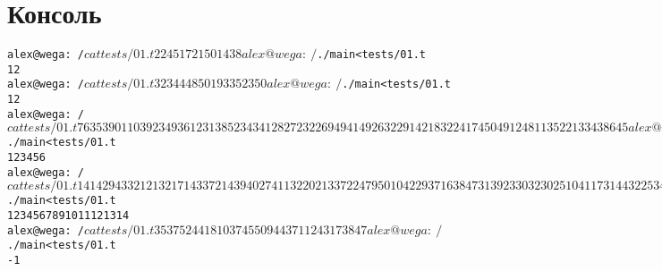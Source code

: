 \pagebreak

\section{Консоль}
\begin{alltt}
alex@wega:~/$ cat tests/01.t 
2 2
45 17 21
50 14 38
alex@wega:~/$ ./main < tests/01.t 
1 2 
alex@wega:~/$ cat tests/01.t 
3 2
34 4 48
50 19 33
5 23 50
alex@wega:~/$ ./main < tests/01.t 
1 2 
alex@wega:~/$ cat tests/01.t 
7 6
35 39 0 11 0 39 23
4 9 36 12 31 38 5
23 43 41 28 27 23 2
26 9 49 41 49 26 32
29 1 42 18 32 24 17
45 0 49 12 48 11 35
22 1 3 34 38 6 45
alex@wega:~/$ ./main < tests/01.t 
1 2 3 4 5 6 
alex@wega:~/$ cat tests/01.t 
14 14
29 43 3 21 21 32 17 14 3 37 21 4 39 40 27
41 13 2 20 21 3 37 22 47 9 50 10 42 29 37
16 38 47 31 39 23 30 32 30 25 1 0 41 17 31
44 32 25 34 17 1 40 21 8 0 45 29 46 2 34
13 39 0 37 4 24 31 20 10 0 30 20 16 20 34
1 50 46 22 8 2 5 32 25 22 47 15 24 0 49
46 35 19 45 32 40 37 49 26 20 2 40 10 25 5
3 39 44 45 21 38 35 6 20 6 43 11 34 21 35
33 39 17 46 22 48 38 16 28 23 26 47 40 12 34
2 34 24 37 32 10 16 50 10 16 17 4 9 23 5
7 26 36 16 39 17 32 27 49 13 42 27 47 41 47
24 15 33 5 47 41 26 32 13 14 36 40 5 26 5
2 44 13 50 41 45 34 48 40 13 42 18 32 7 33
6 28 40 38 10 5 20 26 45 4 31 8 49 31 9
alex@wega:~/$ ./main < tests/01.t 
1 2 3 4 5 6 7 8 9 10 11 12 13 14 
alex@wega:~/$ cat tests/01.t 
3 5
37 5 24 41 8 10
37 45 50 9 44 37
1 12 43 17 38 47
alex@wega:~/$ ./main < tests/01.t 
-1
\end{alltt}
\pagebreak
